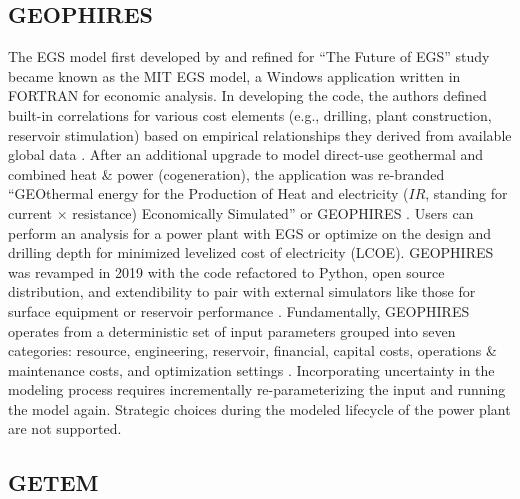\subsection{GEOPHIRES}\label{ch2:geophires}

The EGS model first developed by \citet{tester_economic_1990} and refined for ``The Future of EGS'' study \citep{tester_future_2006} became known as the MIT EGS model, a Windows application written in FORTRAN for economic analysis. In developing the code, the authors defined built-in correlations for various cost elements (e.g., drilling, plant construction, reservoir stimulation) based on empirical relationships they derived from available global data \citep{tester_future_2006}. After an additional upgrade to model direct-use geothermal and combined heat \& power (cogeneration), the application was re-branded ``GEOthermal energy for the Production of Heat and electricity ($IR$, standing for current $\times$ resistance) Economically Simulated'' or GEOPHIRES \citep{beckers_introducing_2013}. Users can perform an analysis for a power plant with EGS or optimize on the design and drilling depth for minimized levelized cost of electricity (LCOE). GEOPHIRES was revamped in 2019 with the code refactored to Python, open source distribution, and extendibility to pair with external simulators like those for surface equipment or reservoir performance \citep{beckers_geophires_2019}. Fundamentally, GEOPHIRES operates from a deterministic set of input parameters grouped into seven categories: resource, engineering, reservoir, financial, capital costs, operations \& maintenance costs, and optimization settings \citep{beckers_introducing_2013}. Incorporating uncertainty in the modeling process requires incrementally re-parameterizing the input and running the model again. Strategic choices during the modeled lifecycle of the power plant are not supported.

\subsection{GETEM}\label{ch2:getem}

